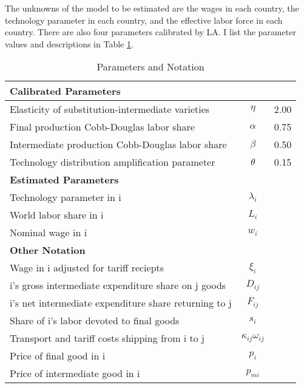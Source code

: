 \documentclass{article}
\begin{document}
The unknowns of the model to be estimated are the wages in each country, the technology parameter in each country, and the effective labor force in each country.  There are also four parameters calibrated by LA.  I list the parameter values and descriptions in Table \ref{parameters}.
\begin{table}
\begin{center}
\begin{tabular}{|l|c|c|}
\hline
\textbf{Calibrated Parameters} & & \\
\hline
 Elasticity of substitution-intermediate varieties 	& $\eta$ 	& 2.00\\
\hline
 Final production Cobb-Douglas labor share		& $\alpha$ 	& 0.75\\
\hline
 Intermediate production Cobb-Douglas labor share	 & $\beta$ 	& 0.50\\
\hline
 Technology distribution amplification parameter	 & $\theta$ 	& 0.15\\
\hline
\textbf{Estimated Parameters} & & \\
\hline
Technology parameter in i	  			& $\lambda_i$ 	&     \\
\hline
World labor share in i	  				& $L_i$ 	&     \\
\hline
Nominal wage in i 		  			& $w_i$ 	&     \\
\hline
\textbf{Other Notation} & & \\
\hline
 Wage in i adjusted for tariff reciepts			& $\xi_i$	& \\
\hline
 i's gross intermediate expenditure share on j goods	& $D_{ij}$	& \\
\hline
 i's net intermediate expenditure share returning to j	& $F_{ij}$	& \\
\hline
 Share of i's labor devoted to final goods		& $s_i$		& \\
\hline
 Transport and tariff costs shipping from i to j	& $\kappa_{ij} \omega_{ij}$& \\
\hline
 Price of final good in i				& $p_i$		& \\
\hline
 Price of intermediate good in i			& $p_{mi}$	& \\
\hline
\end{tabular}
\end{center}
\caption{Parameters and Notation}
\label{parameters}
\end{table}
\end{document}
